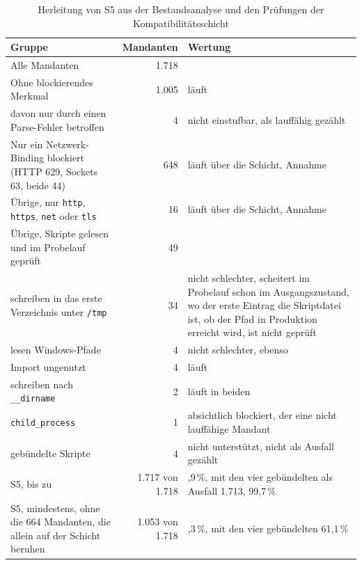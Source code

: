 \begin{table}[H]
  \caption{Herleitung von S5 aus der Bestandsanalyse und den Prüfungen der Kompatibilitätsschicht}
  \label{tab:s6}
  \small
  \begin{tabularx}{\textwidth}{@{}>{\RaggedRight\arraybackslash}X r >{\RaggedRight\arraybackslash}p{}@{}}
    \hline
    Gruppe & Mandanten & Wertung \\
    \hline
    Alle Mandanten & 1.718 & \\
    Ohne blockierendes Merkmal & 1.005 & läuft \\
    \quad davon nur durch einen Parse-Fehler betroffen & 4 & nicht einstufbar, als lauffähig gezählt \\
    Nur ein Netzwerk-Binding blockiert (HTTP 629, Sockets 63, beide 44) & 648 & läuft über die Schicht, Annahme \\
    Übrige, nur \texttt{http}, \texttt{https}, \texttt{net} oder \texttt{tls} & 16 & läuft über die Schicht, Annahme \\
    Übrige, Skripte gelesen und im Probelauf geprüft & 49 & \\
    \quad schreiben in das erste Verzeichnis unter \texttt{/tmp} & 34 & nicht schlechter, scheitert im Probelauf schon im Ausgangszustand, wo der erste Eintrag die Skriptdatei ist, ob der Pfad in Produktion erreicht wird, ist nicht geprüft \\
    \quad lesen Windows-Pfade & 4 & nicht schlechter, ebenso \\
    \quad Import ungenutzt & 4 & läuft \\
    \quad schreiben nach \texttt{\_\_dirname} & 2 & läuft in beiden \\
    \quad \texttt{child\_process} & 1 & absichtlich blockiert, der eine nicht lauffähige Mandant \\
    \quad gebündelte Skripte & 4 & nicht unterstützt, nicht als Ausfall gezählt \\
    S5, bis zu & 1.717 von 1.718 & 99,9\,\%, mit den vier gebündelten als Ausfall 1.713, 99,7\,\% \\
    S5, mindestens, ohne die 664 Mandanten, die allein auf der Schicht beruhen & 1.053 von 1.718 & 61,3\,\%, mit den vier gebündelten 61,1\,\% \\
    \hline
  \end{tabularx}
\end{table}


